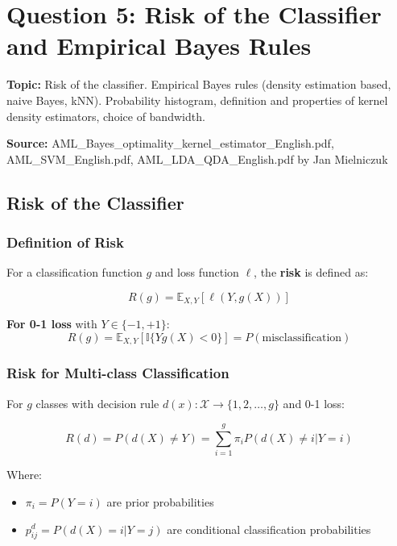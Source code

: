 \documentclass[12pt,a4paper]{article}
\begin{document}
\newpage
\section{Question 5: Risk of the Classifier and Empirical Bayes Rules}

\textbf{Topic:} Risk of the classifier. Empirical Bayes rules (density estimation based, naive Bayes, kNN). Probability histogram, definition and properties of kernel density estimators, choice of bandwidth.

\textbf{Source:} AML\_Bayes\_optimality\_kernel\_estimator\_English.pdf, AML\_SVM\_English.pdf, AML\_LDA\_QDA\_English.pdf by Jan Mielniczuk

\subsection{Risk of the Classifier}

\subsubsection{Definition of Risk}

For a classification function $g$ and loss function $\ell$, the \textbf{risk} is defined as:

\begin{equation}
R(g) = \mathbb{E}_{X,Y}[\ell(Y, g(X))]
\end{equation}

\textbf{For 0-1 loss} with $Y \in \{-1, +1\}$:
\begin{equation}
R(g) = \mathbb{E}_{X,Y}[\mathbb{I}\{Yg(X) < 0\}] = P(\text{misclassification})
\end{equation}

\subsubsection{Risk for Multi-class Classification}

For $g$ classes with decision rule $d(x): \mathcal{X} \to \{1, 2, \ldots, g\}$ and 0-1 loss:

\begin{equation}
R(d) = P(d(X) \neq Y) = \sum_{i=1}^g \pi_i P(d(X) \neq i | Y = i)
\end{equation}

Where:
\begin{itemize}
    \item $\pi_i = P(Y = i)$ are prior probabilities
    \item $p_{ij}^d = P(d(X) = i | Y = j)$ are conditional classification probabilities
\end{itemize}
\end{document}

